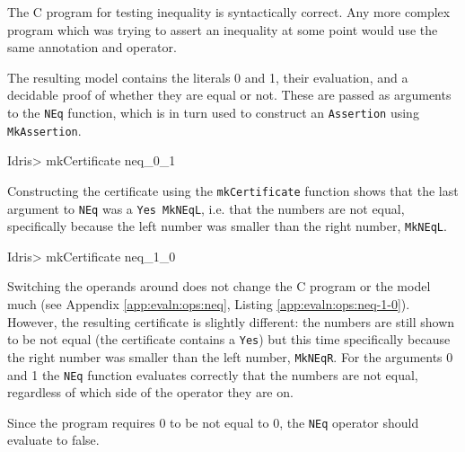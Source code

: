         The C program for testing inequality is syntactically correct. Any more complex program which was trying to assert an inequality at some point would use the same annotation and operator.
        
        \newpage
        
        
        The resulting \Idris model contains the literals 0 and 1, their evaluation, and a decidable proof of whether they are equal or not. These are passed as arguments to the \texttt{NEq} function, which is in turn used to construct an \texttt{Assertion} using \texttt{MkAssertion}.
        
        \begin{code}
Idris> mkCertificate neq_0_1
        \end{code}
        
        Constructing the certificate using the \texttt{mkCertificate} function shows that the last argument to \texttt{NEq} was a \texttt{Yes MkNEqL}, i.e. that the numbers are not equal, specifically because the left number was smaller than the right number, \texttt{MkNEqL}.
        
        \newpage
        
        \begin{code}
Idris> mkCertificate neq_1_0
        \end{code}
        
        Switching the operands around does not change the C program or the model much (see Appendix \ref{app:evaln:ops:neq}, Listing \ref{app:evaln:ops:neq-1-0}). However, the resulting certificate is slightly different: the numbers are still shown to be not equal (the certificate contains a \texttt{Yes}) but this time specifically because the right number was smaller than the left number, \texttt{MkNEqR}.
        For the arguments 0 and 1 the \texttt{NEq} function evaluates correctly that the numbers are not equal, regardless of which side of the operator they are on.
        
        
        
        
        Since the program requires 0 to be not equal to 0, the \texttt{NEq} operator should evaluate to false.
        
